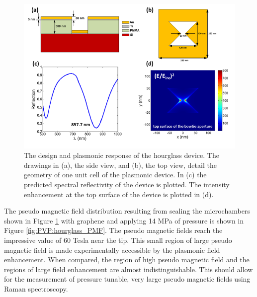 \begin{figure}
  \begin{center}
  \includegraphics[scale=.75]{Figs_PVP/HourGlass_Plasmonics.png}
  \end{center}
  \caption[The design and plasmonic response of the hourglass device]{\label{fig:PVP:hourglass_Plas} The design and plasmonic response of the hourglass device.  The drawings in (a), the side view, and (b), the top view, detail the geometry of one unit cell of the plasmonic device. In (c) the predicted spectral reflectivity of the device is plotted.  The intensity enhancement at the top surface of the device is plotted in (d).}
\end{figure}

The pseudo magnetic field distribution resulting from sealing the microchambers shown in Figure \ref{fig:PVP:hourglass_Plas} with graphene and applying 14 MPa of pressure is shown in Figure \ref{fig:PVP:hourglass_PMF}.
The pseudo magnetic fields reach the impressive value of 60 Tesla near the tip.
This small region of large pseudo magnetic field is made experimentally accessible by the plasmonic field enhancement.
When compared, the region of high pseudo magnetic field and the regions of large field enhancement are almost indistinguishable.
This should allow for the measurement of pressure tunable, very large pseudo magnetic fields using Raman spectroscopy.

